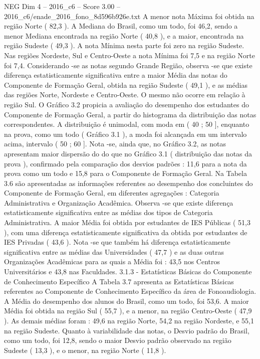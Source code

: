 \begin{textsample}{NEG Dim 4 – 2016\_c6 – Score 3.00 – 2016\_c6/enade\_2016\_fono\_8d596b926e.txt}
A menor nota Máxima foi obtida na região Norte ( 82,3 ).
A Mediana do Brasil, como um todo, foi 46,2, sendo a menor Mediana encontrada na região Norte ( 40,8 ), e a maior, encontrada na região Sudeste ( 49,3 ).
A nota Mínima nesta parte foi zero na região Sudeste.
Nas regiões Nordeste, Sul e Centro-Oeste a nota Mínima foi 7,5 e na região Norte foi 7,4.
Considerando -se as notas segundo Grande Região, observa -se que existe diferença estatisticamente significativa entre a maior Média das notas do Componente de Formação Geral, obtida na região Sudeste ( 49,1 ), e as médias das regiões Norte, Nordeste e Centro-Oeste.
O mesmo não ocorre em relação à região Sul.
O Gráfico 3.2 propicia a avaliação do desempenho dos estudantes do Componente de Formação Geral, a partir do histograma da distribuição das notas correspondentes.
A distribuição é unimodal, com moda em ( 40 ; 50 ], enquanto na prova, como um todo ( Gráfico 3.1 ), a moda foi alcançada em um intervalo acima, intervalo ( 50 ; 60 ].
Nota -se, ainda que, no Gráfico 3.2, as notas apresentam maior dispersão do do que no Gráfico 3.1 ( distribuição das notas da prova ), confirmado pela comparação dos desvios padrões : 11,6 para a nota da prova como um todo e 15,8 para o Componente de Formação Geral.
Na Tabela 3.6 são apresentadas as informações referentes ao desempenho dos concluintes do Componente de Formação Geral, em diferentes agregações : Categoria Administrativa e Organização Acadêmica.
Observa -se que existe diferença estatisticamente significativa entre as médias dos tipos de Categoria Administrativa.
A maior Média foi obtida por estudantes de IES Públicas ( 51,3 ), com uma diferença estatisticamente significativa da obtida por estudantes de IES Privadas ( 43,6 ).
Nota -se que também há diferença estatisticamente significativa entre as médias das Universidades ( 47,7 ) e as duas outras Organizações Acadêmicas para as quais a Média foi : 43,5 nos Centros Universitários e 43,8 nas Faculdades. 3.1.3 - Estatísticas Básicas do Componente de Conhecimento Específico A Tabela 3.7 apresenta as Estatísticas Básicas referentes ao Componente de Conhecimento Específico da área de Fonoaudiologia.
A Média do desempenho dos alunos do Brasil, como um todo, foi 53,6.
A maior Média foi obtida na região Sul ( 55,7 ), e a menor, na região Centro-Oeste ( 47,9 ).
As demais médias foram : 49,6 na região Norte, 54,2 na região Nordeste, e 55,1 na região Sudeste.
Quanto à variabilidade das notas, o Desvio padrão do Brasil, como um todo, foi 12,8, sendo o maior Desvio padrão observado na região Sudeste ( 13,3 ), e o menor, na região Norte ( 11,8 ).

\end{textsample}
